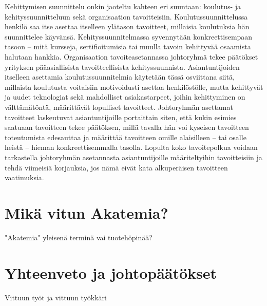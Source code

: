 \documentclass[a4paper,finnish,12pt]{article}
\begin{document}
Kehittymisen suunnittelu onkin jaoteltu kahteen eri suuntaan: koulutus- ja kehityssuunnitteluun sekä organisaation tavoitteisiin. Koulutussuunnittelussa henkilö saa itse asettaa itselleen ylätason tavoitteet, millaisia koulutuksia hän suunnittelee käyvänsä. Kehityssuunnitelmassa syvennytään konkreettisempaan tasoon -- mitä kursseja, sertifioitumisia tai muulla tavoin kehittyvää osaamista halutaan hankkia. Organisaation tavoiteasetannassa johtoryhmä tekee päätökset yrityksen pääasiallisista tavoitteellisista kehityssuunnista. Asiantuntijoiden itselleen asettamia koulutussuunnitelmia käytetään tässä osviittana siitä, millaista koulutusta voitaisiin motivoidusti asettaa henkilöstölle, mutta kehittyvät ja uudet teknologiat sekä mahdolliset asiakastarpeet, joihin kehittyminen on välttämätöntä, määrittävät lopulliset tavoitteet. Johtoryhmän asettamat tavoitteet laskeutuvat asiantuntijoille portaittain siten, että kukin esimies saatuaan tavoitteen tekee päätöksen, millä tavalla hän voi kyseisen tavoitteen toteutumista edesauttaa ja määrittää tavoitteen omille alaisilleen -- tai osalle heistä -- hieman konkreettisemmalla tasolla. Lopulta koko tavoitepolkua voidaan tarkastella johtoryhmän asetannasta asiantuntijoille määriteltyihin tavoitteisiin ja tehdä viimeisiä korjauksia, jos nämä eivät kata alkuperäisen tavoitteen vaatimuksia.

\pagebreak

\section{Mikä vitun Akatemia?}

"Akatemia" yleisenä terminä vai tuotehöpinää?

\pagebreak

\section{Yhteenveto ja johtopäätökset}

Vittuun työt ja vittuun työkkäri

\pagebreak


\clearpage



\appendix
\end{document}
